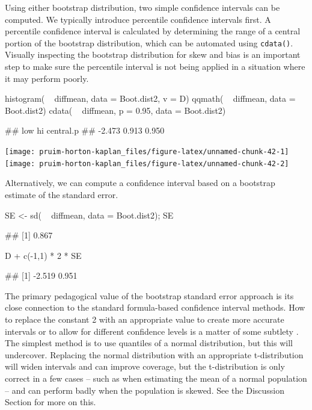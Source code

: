 Using either bootstrap distribution, two simple confidence intervals can
be computed. We typically introduce percentile confidence intervals
first. A percentile confidence interval is calculated by determining the
range of a central portion of the bootstrap distribution, which can be
automated using \texttt{cdata()}. Visually inspecting the bootstrap
distribution for skew and bias is an important step to make sure the
percentile interval is not being applied in a situation where it may
perform poorly.

\begin{Schunk}
\begin{Sinput}
histogram( ~ diffmean, data = Boot.dist2, v = D)
qqmath( ~ diffmean, data = Boot.dist2)
cdata( ~ diffmean, p = 0.95, data = Boot.dist2)
\end{Sinput}
\begin{Soutput}
##       low        hi central.p 
##    -2.473     0.913     0.950
\end{Soutput}


\begin{center}\texttt{[image: pruim-horton-kaplan\_files/figure-latex/unnamed-chunk-42-1]} \texttt{[image: pruim-horton-kaplan\_files/figure-latex/unnamed-chunk-42-2]} \end{center}

\end{Schunk}

Alternatively, we can compute a confidence interval based on a bootstrap
estimate of the standard error.

\begin{Schunk}
\begin{Sinput}
SE <- sd( ~ diffmean, data = Boot.dist2); SE
\end{Sinput}
\begin{Soutput}
## [1] 0.867
\end{Soutput}
\begin{Sinput}
D + c(-1,1) * 2 * SE
\end{Sinput}
\begin{Soutput}
## [1] -2.519  0.951
\end{Soutput}
\end{Schunk}

\noindent
The primary pedagogical value of the bootstrap standard error approach
is its close connection to the standard formula-based confidence
interval methods. How to replace the constant 2 with an appropriate
value to create more accurate intervals or to allow for different
confidence levels is a matter of some subtlety \citep{Hesterberg:2015}.
The simplest method is to use quantiles of a normal distribution, but
this will undercover. Replacing the normal distribution with an
appropriate t-distribution will widen intervals and can improve
coverage, but the t-distribution is only correct in a few cases -- such
as when estimating the mean of a normal population -- and can perform
badly when the population is skewed. See the Discussion Section for more
on this.

